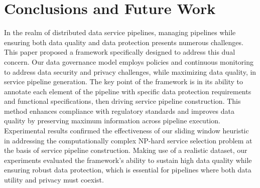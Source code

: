 \documentclass[sn-mathphys-num,referee]{sn-jnl}
\theoremstyle{definition}
\begin{document}












\section{Conclusions and Future Work}\label{sec:conclusions}
In the realm of distributed data service pipelines, managing pipelines while ensuring both data quality and data protection presents numerous challenges. This paper proposed a framework specifically designed to address this dual concern. Our data governance model employs policies and continuous monitoring to address data security and privacy challenges, while maximizing data quality, in service pipeline generation. The key point of the framework is in its ability to annotate each element of the pipeline with specific data protection requirements and functional specifications, then driving service pipeline construction. This method enhances compliance with regulatory standards and improves data quality by preserving maximum information across pipeline execution. Experimental results confirmed the effectiveness of our sliding window heuristic in addressing the computationally complex NP-hard service selection problem at the basis of service pipeline construction. Making use of a realistic dataset, our experiments evaluated the framework's ability to sustain high data quality while ensuring robust data protection, which is essential for pipelines where both data utility and privacy must coexist.
\end{document}
